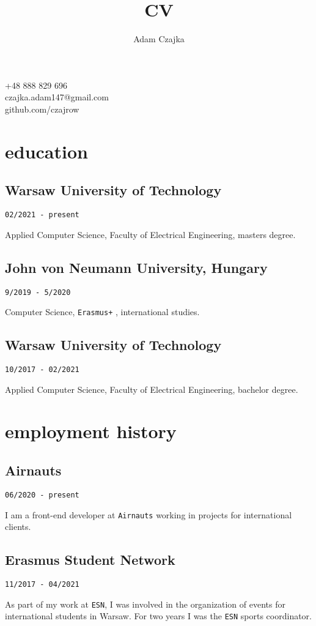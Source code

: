 \documentclass{article}
\makeatletter
\renewcommand{\maketitle}{
    \begin{center}



        {\huge\bfseries\theauthor}

        \vspace{.25em}

        +48 888 829 696\\czajka.adam147@gmail.com\\github.com/czajrow
	\end{center}
	\vspace{-.5cm}
}
\makeatother
\begin{document}
\title{CV}
\author{Adam Czajka}

\maketitle

\vspace{2em}

\begin{minipage}[t]{.5\textwidth}
	\section{education}

    \subsection{Warsaw University of Technology}
	\texttt{02/2021 - present}
	\par Applied Computer Science, Faculty of Electrical Engineering, masters degree.

    \subsection{John von Neumann University, Hungary}
	\texttt{9/2019 - 5/2020}
	\par Computer Science, \texttt{Erasmus+} , international studies.

	\subsection{Warsaw University of Technology}
	\texttt{10/2017 - 02/2021}
	\par Applied Computer Science, Faculty of Electrical Engineering, bachelor degree.

	\vspace{2em}

	\section{employment history}

    \subsection{Airnauts}
	\texttt{06/2020 - present}
	\par I am a front-end developer at \texttt{Airnauts} working in projects for international clients.


	\subsection{Erasmus Student Network}
	\texttt{11/2017 - 04/2021}
	\par As part of my work at \texttt{ESN}, I was involved in the organization of events for international students in Warsaw. For two years I was the \texttt{ESN} sports coordinator.


\end{minipage}
\end{document}
